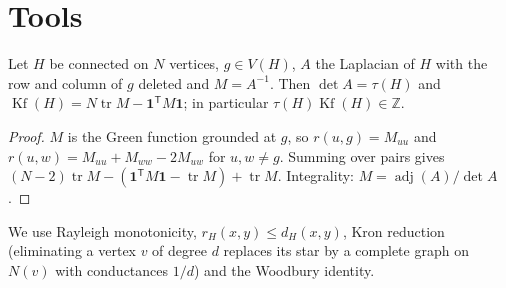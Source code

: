 \documentclass[11pt,a4paper]{report}
\newcommand{\Kf}{\operatorname{Kf}}
\newcommand{\one}{\mathbf{1}}
\begin{document}
\section{Tools}
\begin{lemma}[note=grounded formula]\label{lem:grounded}
Let $H$ be connected on $N$ vertices, $g\in V(H)$, $A$ the Laplacian of $H$ with the row and column of $g$
deleted and $M=A^{-1}$. Then $\det A=\tau(H)$ and $\Kf(H)=N\operatorname{tr}M-\one^{\mathsf T}M\one$; in
particular $\tau(H)\Kf(H)\in\mathbb Z$.
\end{lemma}
\begin{proof}
$M$ is the Green function grounded at $g$, so $r(u,g)=M_{uu}$ and $r(u,w)=M_{uu}+M_{ww}-2M_{uw}$ for
$u,w\ne g$. Summing over pairs gives $(N-2)\operatorname{tr}M-(\one^{\mathsf T}M\one-\operatorname{tr}M)
+\operatorname{tr}M$. Integrality: $M=\operatorname{adj}(A)/\det A$.
\end{proof}
We use Rayleigh monotonicity, $r_H(x,y)\le d_H(x,y)$, Kron reduction (eliminating a vertex $v$ of degree $d$
replaces its star by a complete graph on $N(v)$ with conductances $1/d$) and the Woodbury identity.
\end{document}

